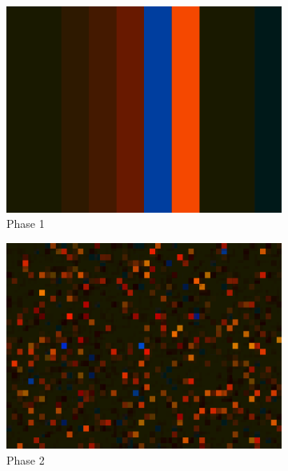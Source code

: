 \begin{figure}
\centering
\begin{subfigure}{.5\textwidth}
  \includegraphics[width=.95\linewidth]{../study-2/results/visualisations/aesthetic-one.png}
  \caption{Phase 1}
  \label{fig:aesthetic-one}
\end{subfigure}%
\begin{subfigure}{.5\textwidth}
  \includegraphics[width=.95\linewidth]{../study-2/results/visualisations/aesthetic-two.png}
  \caption{Phase 2}
  \label{fig:aesthetic-two}
\end{subfigure}\\
\begin{subfigure}{.5\textwidth}

\end{subfigure}
\end{figure}

